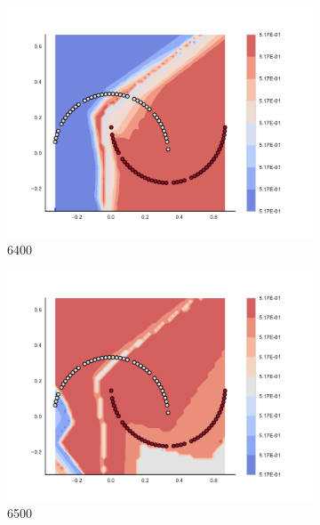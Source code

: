 \begin{figure}[h]
\begin{subfigure}[b]{0.09\textwidth}
    \includegraphics[clip, trim=2.35cm 1.75cm 4.5cm 0cm,width=\textwidth]{img/convergence/6400.pdf}
    \caption{6400}
    \label{fig:convergence_6400}
\end{subfigure}
%
\begin{subfigure}[b]{0.09\textwidth}
    \includegraphics[clip, trim=2.35cm 1.75cm 4.5cm 0cm,width=\textwidth]{img/convergence/6500.pdf}
    \caption{6500}
    \label{fig:convergence_6500}
\end{subfigure}
%
\begin{subfigure}[b]{0.09\textwidth}

\end{subfigure}
\end{figure}
